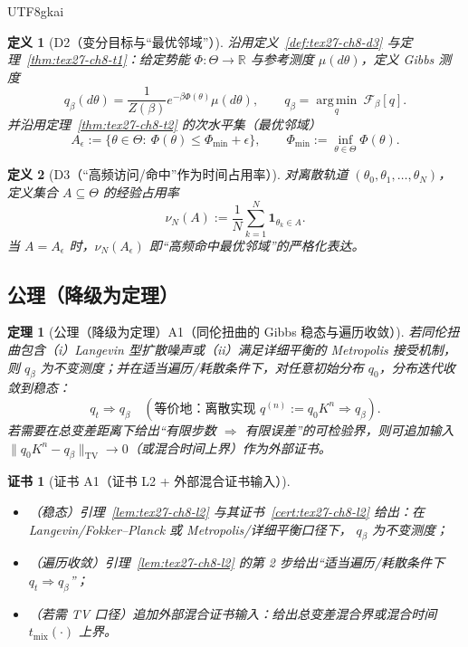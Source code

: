 \documentclass[12pt]{article}
\newtheorem{definition}{定义}[section]
\newtheorem{theorem}{定理}[section]
\newtheorem{Certificate}{证书}[section]
\newcommand{\RR}{\mathbb{R}}
\newcommand{\indicator}[1]{\mathbf{1}_{#1}}
\begin{document}
\begin{CJK*}{UTF8}{gkai}
\begin{definition}[D2（变分目标与“最优邻域”）]
\label{def:tex27-ch21-d2}
沿用定义~\ref{def:tex27-ch8-d3} 与定理~\ref{thm:tex27-ch8-t1}：给定势能 $\Phi:\Theta\to\RR$ 与参考测度 $\mu(d\theta)$，定义 Gibbs 测度
\[
  q_\beta(d\theta)=\frac{1}{Z(\beta)}e^{-\beta\Phi(\theta)}\mu(d\theta),
  \qquad
  q_\beta=\operatorname*{arg\,min}_{q}\ \mathcal{F}_\beta[q].
\]
并沿用定理~\ref{thm:tex27-ch8-t2} 的次水平集（最优邻域）
\[
  A_\epsilon:=\bigl\{\theta\in\Theta:\ \Phi(\theta)\le \Phi_{\min}+\epsilon\bigr\},
  \qquad
  \Phi_{\min}:=\inf_{\theta\in\Theta}\Phi(\theta).
\]
\end{definition}

\begin{definition}[D3（“高频访问/命中”作为时间占用率）]
\label{def:tex27-ch21-d3}
对离散轨道 $(\theta_0,\theta_1,\dots,\theta_N)$，定义集合 $A\subseteq\Theta$ 的经验占用率
\[
  \nu_{N}(A):=\frac{1}{N}\sum_{k=1}^{N}\indicator{\theta_k\in A}.
\]
当 $A=A_\epsilon$ 时，$\nu_N(A_\epsilon)$ 即“高频命中最优邻域”的严格化表达。
\end{definition}

\subsection{公理（降级为定理）}
\label{subsec:tex27-ch21-axioms}

\begin{theorem}[公理（降级为定理）A1（同伦扭曲的 Gibbs 稳态与遍历收敛）]
\label{thm:tex27-ch21-a1}
若同伦扭曲包含（i）Langevin 型扩散噪声或（ii）满足详细平衡的 Metropolis 接受机制，
则 $q_\beta$ 为不变测度；并在适当遍历/耗散条件下，对任意初始分布 $q_0$，分布迭代收敛到稳态：
\[
  q_t\Rightarrow q_\beta
  \quad
  (\text{等价地：离散实现 }q^{(n)}:=q_0K^n\Rightarrow q_\beta).
\]
若需要在总变差距离下给出“有限步数 $\Rightarrow$ 有限误差”的可检验界，则可追加输入
$\|q_0K^n-q_\beta\|_{\mathrm{TV}}\to 0$（或混合时间上界）作为外部证书。
\end{theorem}

\begin{Certificate}[证书 A1（证书 L2 + 外部混合证书输入）]
\label{cert:tex27-ch21-a1}
\begin{itemize}
  \item（稳态）引理~\ref{lem:tex27-ch8-l2} 与其证书~\ref{cert:tex27-ch8-l2} 给出：在 Langevin/Fokker--Planck 或 Metropolis/详细平衡口径下，
    $q_\beta$ 为不变测度；
  \item（遍历收敛）引理~\ref{lem:tex27-ch8-l2} 的第 2 步给出“适当遍历/耗散条件下 $q_t\Rightarrow q_\beta$”；
  \item（若需 TV 口径）追加外部混合证书输入：给出总变差混合界或混合时间 $t_{\mathrm{mix}}(\cdot)$ 上界。
\end{itemize}
\end{Certificate}


\end{CJK*}
\end{document}
